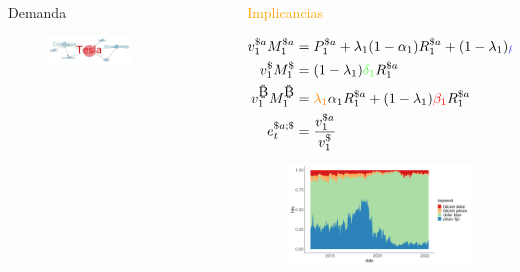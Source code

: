 \begin{frame}
\begin{columns}
\begin{column}{0.50\textwidth}
\begin{block}{\textcolor{dgreen}{Demanda}}
            \begin{figure}[t!]
            \begin{center}
            \includegraphics[width=0.6\textwidth]{images/C3/c3_simul_influ3.jpg}
             \end{center}
            \end{figure}
            
    \end{block}
    \end{column}
    
    \begin{column}{0.55\textwidth}
    
    \begin{block}{\textcolor{orange}{Implicancias}}
    \tiny

    \begin{align*}
    v^{\$a}_1 M^{\$a}_1&=P_1^{{\$a}} + \lambda_1 (1-\alpha_1) R_1^{{\$a}} + (1-\lambda_1) \textcolor{blue!60}{\rho_1}  R_1^{{\$a}}\\
    v_1^{\$} M_1^{\$}&=(1-\lambda_1) \textcolor{green!70}{\delta_1} R_1^{\$a}\\
    v_1^{\bitcoinA} M_1^{\bitcoinA}&=\textcolor{orange}{\lambda_1}  \alpha_1 R_1^{\$a} + (1-\lambda_1) \textcolor{red}{\beta_1} R_1^{\$a}\\
    e_t^{{\$a};{\$}}&=\frac{v_1^{\$a}}{v_1^{\$}}
    \end{align*}
    
    \vspace{-5pt}
    
    \begin{figure}[H]
    \begin{center}
     \includegraphics[width=1\textwidth]{images/C4/Rplot001.png}
     \end{center}
    \end{figure}
    

\end{block}
\end{column}
\end{columns}
\end{frame}
